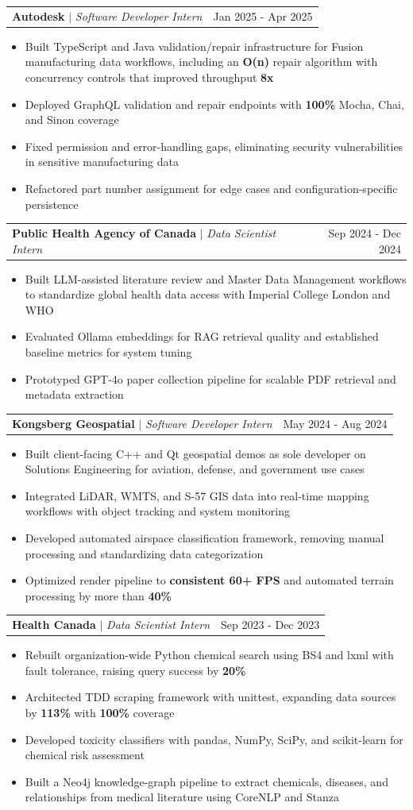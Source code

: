 \documentclass[letterpaper,10pt]{article}  %
\makeatletter
\newcommand{\resumeItem}[1]{
  \item\small{  %
    {#1 \vspace{0pt}}  %
  }
}
\newcommand{\resumeSubheading}[3]{
    \item
    \begin{tabular*}{0.97\textwidth}[t]{l@{\extracolsep{\fill}}r}
      \textbf{#1} $|$ \textit{ #2} & #3 \\  %
    \end{tabular*}\vspace{-3pt}  %
}
\newcommand{\resumeItemListStart}{\begin{itemize}[topsep=1.5pt, itemsep=0pt, parsep=0pt, partopsep=0pt]}
\newcommand{\resumeItemListEnd}{\end{itemize}\vspace{-1pt}}  %
\makeatother
\begin{document}
    \resumeSubheading{Autodesk}{Software Developer Intern}{Jan 2025 - Apr 2025}
        \resumeItemListStart
            \resumeItem{Built TypeScript and Java validation/repair infrastructure for Fusion manufacturing data workflows, including an \textbf{O(n)} repair algorithm with concurrency controls that improved throughput \textbf{8x}}
            \resumeItem{Deployed GraphQL validation and repair endpoints with \textbf{100\%} Mocha, Chai, and Sinon coverage}
            \resumeItem{Fixed permission and error-handling gaps, eliminating security vulnerabilities in sensitive manufacturing data}
            \resumeItem{Refactored part number assignment for edge cases and configuration-specific persistence}
        \resumeItemListEnd

    \resumeSubheading{Public Health Agency of Canada}{Data Scientist Intern}{Sep 2024 - Dec 2024}
        \resumeItemListStart
            \resumeItem{Built LLM-assisted literature review and Master Data Management workflows to standardize global health data access with Imperial College London and WHO}
            \resumeItem{Evaluated Ollama embeddings for RAG retrieval quality and established baseline metrics for system tuning}
            \resumeItem{Prototyped GPT-4o paper collection pipeline for scalable PDF retrieval and metadata extraction}
        \resumeItemListEnd

    \resumeSubheading{Kongsberg Geospatial}{Software Developer Intern}{May 2024 - Aug 2024}
      \resumeItemListStart
        \resumeItem{Built client-facing C++ and Qt geospatial demos as sole developer on Solutions Engineering for aviation, defense, and government use cases}
        \resumeItem{Integrated LiDAR, WMTS, and S-57 GIS data into real-time mapping workflows with object tracking and system monitoring}
        \resumeItem{Developed automated airspace classification framework, removing manual processing and standardizing data categorization}
        \resumeItem{Optimized render pipeline to \textbf{consistent 60+ FPS} and automated terrain processing by more than \textbf{40\%}}
      \resumeItemListEnd

    \resumeSubheading{Health Canada}{Data Scientist Intern}{Sep 2023 - Dec 2023}
      \resumeItemListStart
        \resumeItem{Rebuilt organization-wide Python chemical search using BS4 and lxml with fault tolerance, raising query success by \textbf{20\%}}
        \resumeItem{Architected TDD scraping framework with unittest, expanding data sources by \textbf{113\%} with \textbf{100\%} coverage}
        \resumeItem{Developed toxicity classifiers with pandas, NumPy, SciPy, and scikit-learn for chemical risk assessment}
        \resumeItem{Built a Neo4j knowledge-graph pipeline to extract chemicals, diseases, and relationships from medical literature using CoreNLP and Stanza}
      \resumeItemListEnd
\end{document}
